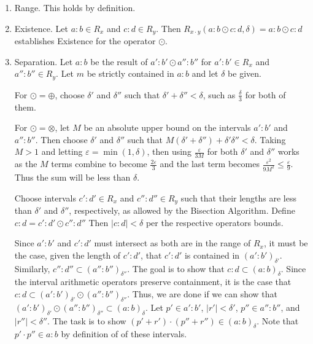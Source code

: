 \documentclass[12pt]{article}
\begin{document}
\begin{enumerate}
    \item Range. This holds by definition. 
    \item Existence. Let $a:b \in R_x$ and $c:d \in R_y$. Then $R_{x\cdot y}(a:b \odot c:d, \delta) = a:b \odot c:d$ establishes Existence for the operator $\odot$. 
    \item Separation. Let $a:b$ be the result of $a':b' \odot a'':b''$ for $a':b' \in R_x$ and $a'': b'' \in R_y$. Let $m$ be strictly contained in $a:b$ and let $\delta$ be given. 
    
    
    For $\odot = \oplus$, choose $\delta'$ and $\delta''$ such that $\delta' + \delta'' < \delta$, such as $\frac{\delta}{3}$ for both of them. 
    
    For $\odot = \otimes$, let $M$ be an absolute upper bound on the intervals $a':b'$ and $a'':b''$. Then choose $\delta'$ and $\delta''$ such that $M (\delta' + \delta'') + \delta' \delta'' < \delta$. Taking $M> 1$ and letting $\varepsilon = \min(1, \delta)$, then using $\frac{\varepsilon}{3M}$ for both $\delta'$ and $\delta''$ works as the $M$ terms combine to become $\frac{2 \varepsilon}{3}$ and the last term becomes $\frac{\varepsilon^2}{9M^2} \leq \frac{\varepsilon}{9}$. Thus the sum will be less than $\delta$.
    
    Choose intervals $c':d' \in R_x$ and $c'':d'' \in R_y$  such that their lengths are less than $\delta'$ and $\delta''$, respectively, as allowed by the Bisection Algorithm. Define $c:d = c':d' \odot c'':d''$ Then $|c:d| < \delta$ per the respective operators bounds. 
    
    Since $a':b'$ and $c':d'$ must intersect as both are in the range of $R_x$, it must be the case, given the length of $c':d'$, that $c':d'$ is contained in $(a':b')_{\delta'}$. Similarly, $c'':d'' \subset (a'':b'')_{\delta''}$. The goal is to show that $c:d \subset (a:b)_\delta$. Since the interval arithmetic operators preserve containment, it is the case that $c:d \subset (a':b')_{\delta'} \odot (a'':b'')_{\delta''}$. Thus, we are done if we can show that  $(a':b')_{\delta'} \odot (a'':b'')_{\delta''} \subset (a:b)_\delta$. Let $p' \in a':b'$, $|r'| < \delta'$, $p'' \in a'':b''$, and $|r''| < \delta''$.  The task is to show $(p'+r') \cdot (p''+ r'') \in (a:b)_\delta$. Note that $p' \cdot p'' \in a:b$ by definition of of these intervals. 


\end{enumerate}
\end{document}

